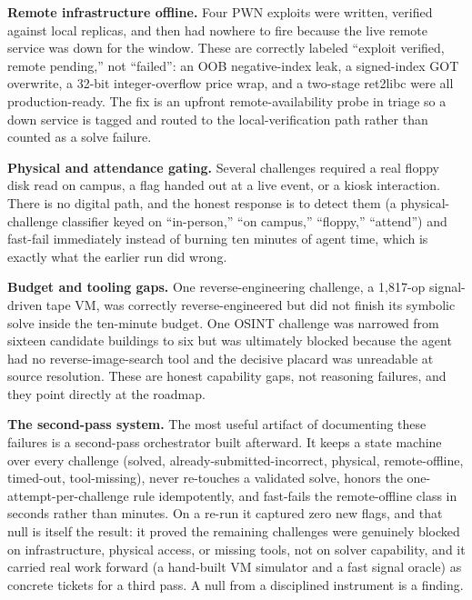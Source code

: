 \documentclass[10pt,twocolumn]{article}
\begin{document}
\medskip
\textbf{Remote infrastructure offline.} Four PWN exploits were written, verified against local replicas, and
then had nowhere to fire because the live remote service was down for the window. These are correctly labeled
``exploit verified, remote pending,'' not ``failed'': an OOB negative-index leak, a signed-index GOT
overwrite, a 32-bit integer-overflow price wrap, and a two-stage ret2libc were all production-ready. The fix
is an upfront remote-availability probe in triage so a down service is tagged and routed to the
local-verification path rather than counted as a solve failure.

\medskip
\textbf{Physical and attendance gating.} Several challenges required a real floppy disk read on campus, a flag
handed out at a live event, or a kiosk interaction. There is no digital path, and the honest response is to
detect them (a physical-challenge classifier keyed on ``in-person,'' ``on campus,'' ``floppy,'' ``attend'')
and fast-fail immediately instead of burning ten minutes of agent time, which is exactly what the earlier run
did wrong.

\medskip
\textbf{Budget and tooling gaps.} One reverse-engineering challenge, a 1{,}817-op signal-driven tape VM, was
correctly reverse-engineered but did not finish its symbolic solve inside the ten-minute budget. One OSINT
challenge was narrowed from sixteen candidate buildings to six but was ultimately blocked because the agent
had no reverse-image-search tool and the decisive placard was unreadable at source resolution. These are
honest capability gaps, not reasoning failures, and they point directly at the roadmap.

\medskip
\textbf{The second-pass system.} The most useful artifact of documenting these failures is a second-pass
orchestrator built afterward. It keeps a state machine over every challenge (solved, already-submitted-incorrect,
physical, remote-offline, timed-out, tool-missing), never re-touches a validated solve, honors the
one-attempt-per-challenge rule idempotently, and fast-fails the remote-offline class in seconds rather than
minutes. On a re-run it captured zero new flags, and that null is itself the result: it proved the remaining
challenges were genuinely blocked on infrastructure, physical access, or missing tools, not on solver
capability, and it carried real work forward (a hand-built VM simulator and a fast signal oracle) as concrete
tickets for a third pass. A null from a disciplined instrument is a finding.
\end{document}
